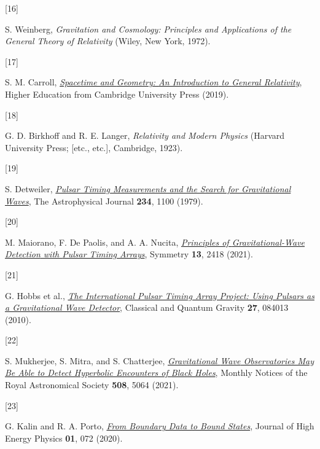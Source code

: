 \documentclass[
  10pt,
  a4paper,
  DIV=11,
  numbers=noendperiod,
  twoside]{scrreprt}
\newlength{\cslhangindent}
\newlength{\csllabelwidth}
\newlength{\cslentryspacingunit} %
\newenvironment{CSLReferences}[2] %
 {%
  \setlength{\parindent}{0pt}
  \ifodd #1
  \let\oldpar\par
  \def\par{\hangindent=\cslhangindent\oldpar}
  \fi
  \setlength{\parskip}{#2\cslentryspacingunit}
 }%
 {}
\newcommand{\CSLLeftMargin}[1]{\parbox[t]{\csllabelwidth}{#1}}
\newcommand{\CSLRightInline}[1]{\parbox[t]{\linewidth - \csllabelwidth}{#1}\break}
\DeclareRobustCommand{\[}{\begin{equation}}
\DeclareRobustCommand{\]}{\end{equation}}
\begin{document}
\begin{CSLReferences}{0}{0}
\leavevmode{}%
\CSLLeftMargin{{[}16{]} }%
\CSLRightInline{S. Weinberg, \emph{Gravitation and Cosmology: Principles
and Applications of the General Theory of Relativity} ({Wiley}, {New
York}, 1972).}

\leavevmode{}%
\CSLLeftMargin{{[}17{]} }%
\CSLRightInline{S. M. Carroll,
\emph{\href{https://doi.org/10.1017/9781108770385}{Spacetime and
{Geometry}: {An Introduction} to {General Relativity}}}, Higher
Education from Cambridge University Press (2019).}

\leavevmode{}%
\CSLLeftMargin{{[}18{]} }%
\CSLRightInline{G. D. Birkhoff and R. E. Langer, \emph{Relativity and
Modern Physics} ({Harvard University Press; {[}etc., etc.{]}},
{Cambridge}, 1923).}

\leavevmode{}%
\CSLLeftMargin{{[}19{]} }%
\CSLRightInline{S. Detweiler,
\emph{\href{https://doi.org/10.1086/157593}{Pulsar Timing Measurements
and the Search for Gravitational Waves}}, The Astrophysical Journal
\textbf{234}, 1100 (1979).}

\leavevmode{}%
\CSLLeftMargin{{[}20{]} }%
\CSLRightInline{M. Maiorano, F. De Paolis, and A. A. Nucita,
\emph{\href{https://doi.org/10.3390/sym13122418}{Principles of
{Gravitational-Wave Detection} with {Pulsar Timing Arrays}}}, Symmetry
\textbf{13}, 2418 (2021).}

\leavevmode{}%
\CSLLeftMargin{{[}21{]} }%
\CSLRightInline{G. Hobbs et al.,
\emph{\href{https://doi.org/10.1088/0264-9381/27/8/084013}{The
International Pulsar Timing Array Project: Using Pulsars as a
Gravitational Wave Detector}}, Classical and Quantum Gravity
\textbf{27}, 084013 (2010).}

\leavevmode{}%
\CSLLeftMargin{{[}22{]} }%
\CSLRightInline{S. Mukherjee, S. Mitra, and S. Chatterjee,
\emph{\href{https://doi.org/10.1093/mnras/stab2721}{Gravitational {Wave}
Observatories May Be Able to Detect Hyperbolic Encounters of {Black
Holes}}}, Monthly Notices of the Royal Astronomical Society
\textbf{508}, 5064 (2021).}

\leavevmode{}%
\CSLLeftMargin{{[}23{]} }%
\CSLRightInline{G. Kalin and R. A. Porto,
\emph{\href{https://doi.org/10.1007/JHEP01(2020)072}{From Boundary Data
to Bound States}}, Journal of High Energy Physics \textbf{01}, 072
(2020).}


\end{CSLReferences}
\end{document}
